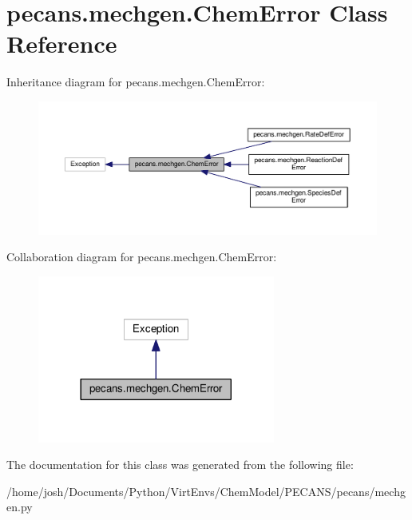 \hypertarget{classpecans_1_1mechgen_1_1ChemError}{}\section{pecans.\+mechgen.\+Chem\+Error Class Reference}
\label{classpecans_1_1mechgen_1_1ChemError}


Inheritance diagram for pecans.\+mechgen.\+Chem\+Error\+:\nopagebreak
\begin{figure}[H]
\begin{center}
\leavevmode
\includegraphics[width=350pt]{classpecans_1_1mechgen_1_1ChemError__inherit__graph}
\end{center}
\end{figure}


Collaboration diagram for pecans.\+mechgen.\+Chem\+Error\+:\nopagebreak
\begin{figure}[H]
\begin{center}
\leavevmode
\includegraphics[width=221pt]{classpecans_1_1mechgen_1_1ChemError__coll__graph}
\end{center}
\end{figure}


The documentation for this class was generated from the following file\+:\begin{DoxyCompactItemize}
\item 
/home/josh/\+Documents/\+Python/\+Virt\+Envs/\+Chem\+Model/\+P\+E\+C\+A\+N\+S/pecans/mechgen.\+py\end{DoxyCompactItemize}
